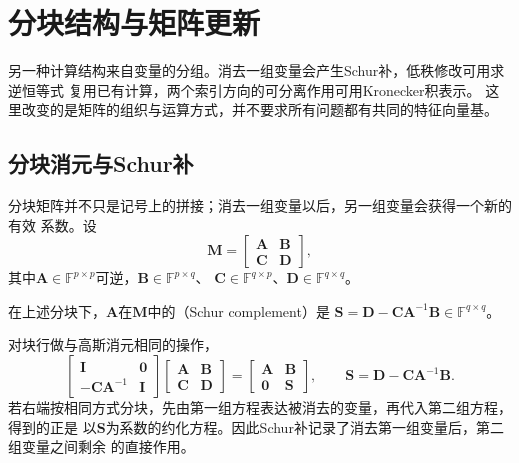 \section{分块结构与矩阵更新}
\label{sec:matrix-analysis-blocks-updates}

另一种计算结构来自变量的分组。消去一组变量会产生Schur补，低秩修改可用求逆恒等式
复用已有计算，两个索引方向的可分离作用可用Kronecker积表示。
这里改变的是矩阵的组织与运算方式，并不要求所有问题都有共同的特征向量基。

\subsection{分块消元与Schur补}

分块矩阵并不只是记号上的拼接；消去一组变量以后，另一组变量会获得一个新的有效
系数。设
\[
  \bm{M}=
  \begin{bmatrix}
    \bm{A}&\bm{B}\\
    \bm{C}&\bm{D}
  \end{bmatrix},
\]
其中$\bm A\in\mathbb F^{p\times p}$可逆，$\bm B\in\mathbb F^{p\times q}$、
$\bm C\in\mathbb F^{q\times p}$、$\bm D\in\mathbb F^{q\times q}$。
\begin{definition}[Schur补]
\label{def:matrix-analysis-schur-complement}
在上述分块下，$\bm A$在$\bm M$中的（Schur complement）是
$\bm S=\bm D-\bm C\bm A^{-1}\bm B\in\mathbb F^{q\times q}$。
\end{definition}
对块行做与高斯消元相同的操作，
\begin{equation}
  \begin{bmatrix}
    \bm{I}&\bm{0}\\
    -\bm{C}\bm{A}^{-1}&\bm{I}
  \end{bmatrix}
  \begin{bmatrix}
    \bm{A}&\bm{B}\\
    \bm{C}&\bm{D}
  \end{bmatrix}
  =
  \begin{bmatrix}
    \bm{A}&\bm{B}\\
    \bm{0}&\bm{S}
  \end{bmatrix},
  \qquad
  \bm{S}=\bm{D}-\bm{C}\bm{A}^{-1}\bm{B}.
  \label{eq:matrix-analysis-schur-complement}
\end{equation}
若右端按相同方式分块，先由第一组方程表达被消去的变量，再代入第二组方程，得到的正是
以$\bm{S}$为系数的约化方程。因此Schur补记录了消去第一组变量后，第二组变量之间剩余
的直接作用。


